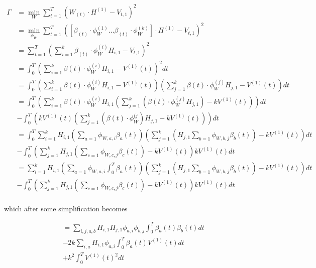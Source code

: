 \documentclass{article}
\begin{document}
  \begin{align*}
    \Gamma & = \min_W \sum_{t=1}^T (W_{(t)} \cdot H^{(1)} - V_{t,1})^2\\
    & = \min_{\phi_W} \sum_{t=1}^T ([\beta_{(t)} \cdot \phi_W^{(1)} \ldots \beta_{(t)} \cdot \phi_W^{(k)}] \cdot H^{(1)} - V_{t,1})^2\\
    & = \sum_{t=1}^T \left( \sum_{i=1}^k \beta_{(t)} \cdot \phi_W^{(i)} H_{i,1} - V_{t,1} \right)^2\\
    & = \int_0^T \left(\sum_{i=1}^k \beta(t) \cdot \phi_W^{(i)} H_{i,1} - V^{(1)}(t) \right)^2 dt\\
    & = \int_0^T \left(\sum_{i=1}^k \beta(t) \cdot \phi_W^{(i)} H_{i,1} - V^{(1)}(t) \right) \left(\sum_{j=1}^k \beta(t) \cdot \phi_W^{(j)} H_{j,1} - V^{(1)}(t) \right) dt\\
    & = \int_0^T \left( \sum_{i=1}^k \beta(t) \cdot \phi_W^{(i)} H_{i,1} \left( \sum_{j=1}^k \left( \beta(t) \cdot \phi_W^{(j)} H_{j,1} \right) - k V^{(1)}(t) \right) \right) dt\\
    & - \int_0^T \left( k V^{(1)}(t) \left( \sum_{j=1}^k \left(\beta(t) \cdot \phi_W^{(j} \right) H_{j,1} - k V^{(1)}(t) \right) \right) dt\\
    & = \int_0^T \sum_{i=1}^k H_{i,1} \left(\sum_{a=1} \phi_{W,a,i} \beta_a(t) \right) \left(\sum_{j=1}^k \left( H_{j,1} \sum_{b=1} \phi_{W,b,j} \beta_b(t) \right) - k V^{(1)}(t) \right) dt\\
    & - \int_0^T \left(\sum_{j=1}^k H_{j,1} \left(\sum_{c=1} \phi_{W,c,j} \beta_c(t) \right) - k V^{(1)}(t) \right) k V^{(1)}(t) dt\\
    & = \sum_{i=1}^k H_{i,1} \left(\sum_{a=1} \phi_{W,a,i} \int_0^T \beta_a(t) \right) \left(\sum_{j=1}^k \left(H_{j,1} \sum_{b=1} \phi_{W,b,j} \beta_b(t) \right) - k V^{(1)}(t) \right) dt\\
    & - \int_0^T \left(\sum_{j=1}^k H_{j,1} \left(\sum_{c=1} \phi_{W,c,j} \beta_c(t) \right) - k V^{(1)}(t) \right) k V^{(1)}(t) dt\\
  \end{align*}

which after some simplification becomes

  \begin{align*}
    & = \sum_{i,j,a,b} H_{i,1} H_{j,1} \phi_{a,i} \phi_{b,j} \int_0^T \beta_a(t) \beta_b(t) dt\\
    & - 2 k \sum_{i,a} H_{i,1} \phi_{a,i} \int_0^T \beta_a(t) V^{(1)}(t) dt\\
    & + k^2 \int_0^T V^{(1)}(t)^2 dt
  \end{align*}
\end{document}
